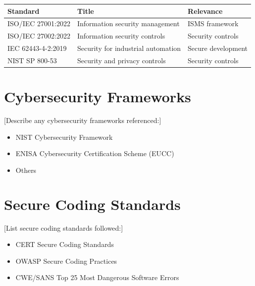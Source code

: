 \documentclass[
  11 pt,
  a4paper,
  table]{report}
\providecommand{\tightlist}{%
  \setlength{\itemsep}{0pt}\setlength{\parskip}{0pt}}\usepackage{longtable,booktabs,array}
\begin{document}
\begin{longtable}[]{@{}
  >{\raggedright\arraybackslash}p{}
  >{\raggedright\arraybackslash}p{}
  >{\raggedright\arraybackslash}p{}@{}}
\toprule\noalign{}
\begin{minipage}[b]{\linewidth}\raggedright
Standard
\end{minipage} & \begin{minipage}[b]{\linewidth}\raggedright
Title
\end{minipage} & \begin{minipage}[b]{\linewidth}\raggedright
Relevance
\end{minipage} \\
\midrule\noalign{}
\endhead
\bottomrule\noalign{}
\endlastfoot
ISO/IEC 27001:2022 & Information security management & ISMS framework \\
ISO/IEC 27002:2022 & Information security controls & Security
controls \\
IEC 62443-4-2:2019 & Security for industrial automation & Secure
development \\
NIST SP 800-53 & Security and privacy controls & Security controls \\
\end{longtable}

\section{Cybersecurity Frameworks}\label{cybersecurity-frameworks}

{[}Describe any cybersecurity frameworks referenced:{]}

\begin{itemize}
\tightlist
\item
  NIST Cybersecurity Framework
\item
  ENISA Cybersecurity Certification Scheme (EUCC)
\item
  Others
\end{itemize}

\section{Secure Coding Standards}\label{secure-coding-standards}

{[}List secure coding standards followed:{]}

\begin{itemize}
\tightlist
\item
  CERT Secure Coding Standards
\item
  OWASP Secure Coding Practices
\item
  CWE/SANS Top 25 Most Dangerous Software Errors
\end{itemize}
\end{document}
